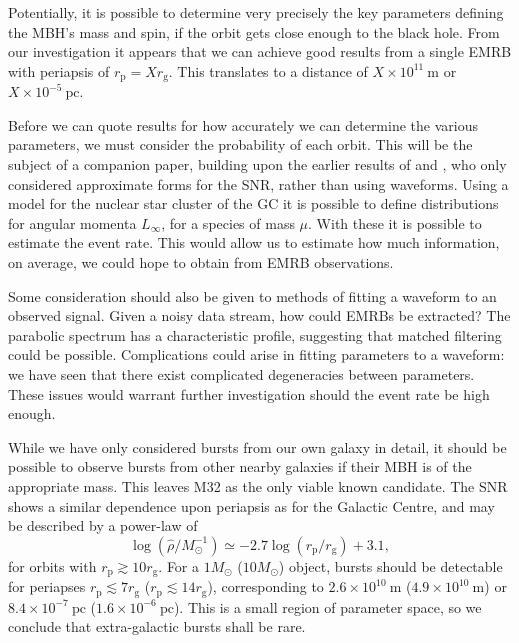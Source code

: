 \documentclass[useAMS,usedcolumn,usegraphicx,usenatbib]{mn2e}
\newcommand{\units}[1]{\ensuremath{~\mathrm{#1}}}
\newcommand{\sub}[1]{\ensuremath{_\mathrm{#1}}}
\begin{document}
Potentially, it is possible to determine very precisely the key parameters defining the MBH's mass and spin, if the orbit gets close enough to the black hole. From our investigation it appears that we can achieve good results from a single EMRB with periapsis of $r\sub{p} = X r\sub{g}$. This translates to a distance of $X \times 10^{11}\units{m}$ or $X \times 10^{-5}\units{pc}$. 

Before we can quote results for how accurately we can determine the various parameters, we must consider the probability of each orbit. This will be the subject of a companion paper, building upon the earlier results of \citet{Rubbo2006} and \citet{Hopman2007}, who only considered approximate forms for the SNR, rather than using waveforms. Using a model for the nuclear star cluster of the GC it is possible to define distributions for angular momenta $L_\infty$, for a species of mass $\mu$. With these it is possible to estimate the event rate. This would allow us to estimate how much information, on average, we could hope to obtain from EMRB observations.

Some consideration should also be given to methods of fitting a waveform to an observed signal. Given a noisy data stream, how could EMRBs be extracted? The parabolic spectrum has a characteristic profile, suggesting that matched filtering could be possible. Complications could arise in fitting parameters to a waveform: we have seen that there exist complicated degeneracies between parameters. These issues would warrant further investigation should the event rate be high enough.

While we have only considered bursts from our own galaxy in detail, it should be possible to observe bursts from other nearby galaxies if their MBH is of the appropriate mass. This leaves M32 as the only viable known candidate. The SNR shows a similar dependence upon periapsis as for the Galactic Centre, and may be described by a power-law of
\begin{equation}
\log\left(\hat{\rho}/M_\odot^{-1}\right) \simeq -2.7\log(r\sub{p}/r\sub{g}) + 3.1,
\end{equation}
for orbits with $r\sub{p} \gtrsim 10 r\sub{g}$. For a $1 M_\odot$ ($10 M_\odot$) object, bursts should be detectable for periapses $r\sub{p} \lesssim 7 r\sub{g}$ ($r\sub{p} \lesssim 14 r\sub{g}$), corresponding to $2.6 \times 10^{10}\units{m}$ ($4.9 \times 10^{10}\units{m}$) or $8.4 \times 10^{-7}\units{pc}$ ($1.6 \times 10^{-6}\units{pc}$). This is a small region of parameter space, so we conclude that extra-galactic bursts shall be rare.
\end{document}
